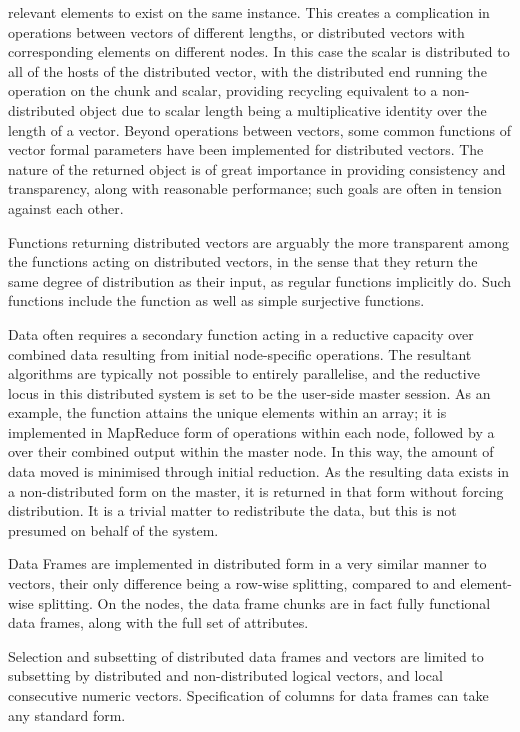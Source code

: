 relevant elements to exist on the same  instance. This creates a
complication in operations between vectors of different lengths, or
distributed vectors with corresponding elements on different nodes. In
this case the scalar is distributed to all of the hosts of the
distributed vector, with the distributed end running the operation on
the chunk and scalar, providing recycling equivalent to a
non-distributed object due to scalar length being a multiplicative
identity over the length of a vector. Beyond operations between vectors,
some common functions of vector formal parameters have been implemented
for distributed vectors. The nature of the returned object is of great
importance in providing consistency and transparency, along with
reasonable performance; such goals are often in tension against each
other.

Functions returning distributed vectors are arguably the more
transparent among the functions acting on distributed vectors, in the
sense that they return the same degree of distribution as their input,
as regular \R{} functions implicitly do. Such functions include the
 function as well as simple surjective functions.

Data often requires a secondary function acting in a reductive capacity
over combined data resulting from initial node-specific operations. The
resultant algorithms are typically not possible to entirely parallelise,
and the reductive locus in this distributed system is set to be the
user-side master \R{} session. As an example, the  function
attains the unique elements within an array; it is implemented in
MapReduce form of  operations within each node, followed
by a  over their combined output within the master node.
In this way, the amount of data moved is minimised through initial
reduction. As the resulting data exists in a non-distributed form on the
master, it is returned in that form without forcing distribution. It is
a trivial matter to redistribute the data, but this is not presumed on
behalf of the system.

Data Frames are implemented in distributed form in a very similar manner
to vectors, their only difference being a row-wise splitting, compared
to and element-wise splitting. On the nodes, the data frame chunks are
in fact fully functional data frames, along with the full set of
attributes.

Selection and subsetting of distributed data frames and vectors are
limited to subsetting by distributed and non-distributed logical
vectors, and local consecutive numeric vectors. Specification of columns
for data frames can take any standard form.

